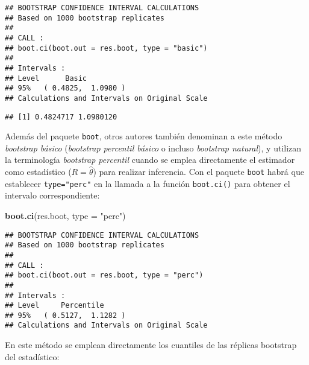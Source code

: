 \documentclass[
]{book}
\newenvironment{Shaded}{\begin{snugshade}}{\end{snugshade}}
\newcommand{\CommentTok}[1]{\textcolor[rgb]{0.56,0.35,0.01}{\textit{#1}}}
\newcommand{\DataTypeTok}[1]{\textcolor[rgb]{0.13,0.29,0.53}{#1}}
\newcommand{\DecValTok}[1]{\textcolor[rgb]{0.00,0.00,0.81}{#1}}
\newcommand{\KeywordTok}[1]{\textcolor[rgb]{0.13,0.29,0.53}{\textbf{#1}}}
\newcommand{\NormalTok}[1]{#1}
\newcommand{\OperatorTok}[1]{\textcolor[rgb]{0.81,0.36,0.00}{\textbf{#1}}}
\newcommand{\StringTok}[1]{\textcolor[rgb]{0.31,0.60,0.02}{#1}}
\theoremstyle{break}
\theoremstyle{definition}
\theoremstyle{definition}
\theoremstyle{definition}
\theoremstyle{remark}
\begin{document}
\begin{verbatim}
## BOOTSTRAP CONFIDENCE INTERVAL CALCULATIONS
## Based on 1000 bootstrap replicates
## 
## CALL : 
## boot.ci(boot.out = res.boot, type = "basic")
## 
## Intervals : 
## Level      Basic         
## 95%   ( 0.4825,  1.0980 )  
## Calculations and Intervals on Original Scale
\end{verbatim}

\begin{Shaded}
\end{Shaded}

\begin{verbatim}
## [1] 0.4824717 1.0980120
\end{verbatim}

Además del paquete \texttt{boot}, otros autores también denominan a este método
\emph{bootstrap básico} (\emph{bootstrap percentil básico} o incluso \emph{bootstrap natural}),
y utilizan la terminología \emph{bootstrap percentil} cuando se emplea
directamente el estimador como estadístico (\(R = \hat \theta\)) para
realizar inferencia. Con el paquete \texttt{boot} habrá que establecer \texttt{type="perc"}
en la llamada a la función \texttt{boot.ci()} para obtener el intervalo
correspondiente:

\begin{Shaded}
\begin{Highlighting}[]
\KeywordTok{boot.ci}\NormalTok{(res.boot, }\DataTypeTok{type =} \StringTok{"perc"}\NormalTok{)}
\end{Highlighting}
\end{Shaded}

\begin{verbatim}
## BOOTSTRAP CONFIDENCE INTERVAL CALCULATIONS
## Based on 1000 bootstrap replicates
## 
## CALL : 
## boot.ci(boot.out = res.boot, type = "perc")
## 
## Intervals : 
## Level     Percentile     
## 95%   ( 0.5127,  1.1282 )  
## Calculations and Intervals on Original Scale
\end{verbatim}

En este método se emplean directamente los cuantiles de las
réplicas bootstrap del estadístico:

\begin{Shaded}
\end{Shaded}
\end{document}
